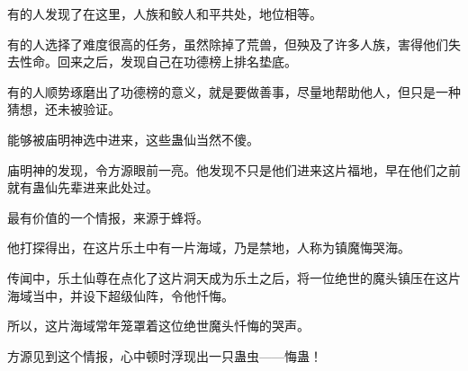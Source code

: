 \begin{this_body}
有的人发现了在这里，人族和鲛人和平共处，地位相等。

有的人选择了难度很高的任务，虽然除掉了荒兽，但殃及了许多人族，害得他们失去性命。回来之后，发现自己在功德榜上排名垫底。

有的人顺势琢磨出了功德榜的意义，就是要做善事，尽量地帮助他人，但只是一种猜想，还未被验证。

能够被庙明神选中进来，这些蛊仙当然不傻。

庙明神的发现，令方源眼前一亮。他发现不只是他们进来这片福地，早在他们之前就有蛊仙先辈进来此处过。

最有价值的一个情报，来源于蜂将。

他打探得出，在这片乐土中有一片海域，乃是禁地，人称为镇魔悔哭海。

传闻中，乐土仙尊在点化了这片洞天成为乐土之后，将一位绝世的魔头镇压在这片海域当中，并设下超级仙阵，令他忏悔。

所以，这片海域常年笼罩着这位绝世魔头忏悔的哭声。

方源见到这个情报，心中顿时浮现出一只蛊虫——悔蛊！

\end{this_body}

